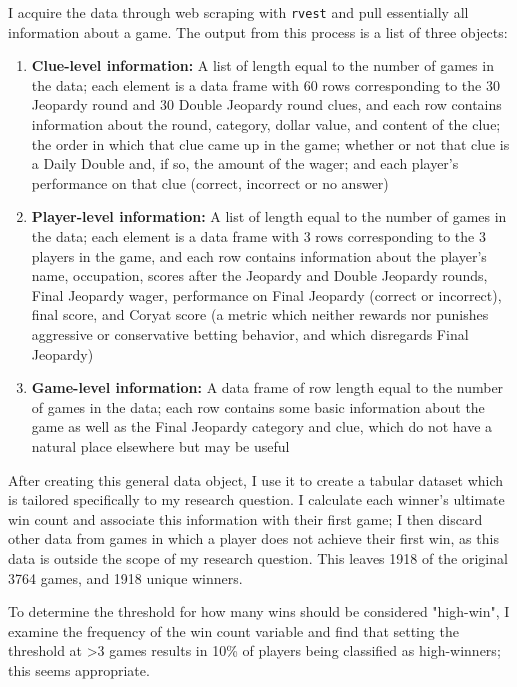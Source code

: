 \documentclass{article}
\begin{document}
	I acquire the data through web scraping with \texttt{rvest} and pull essentially all information about a game. The output from this process is a list of three objects:
	
	\begin{enumerate}
		
		\item \textbf{Clue-level information:} A list of length equal to the number of games in the data; each element is a data frame with 60 rows corresponding to the 30 Jeopardy round and 30 Double Jeopardy round clues, and each row contains information about the round, category, dollar value, and content of the clue; the order in which that clue came up in the game; whether or not that clue is a Daily Double and, if so, the amount of the wager; and each player's performance on that clue (correct, incorrect or no answer)
		
		\item \textbf{Player-level information:} A list of length equal to the number of games in the data; each element is a data frame with 3 rows corresponding to the 3 players in the game, and each row contains information about the player's name, occupation, scores after the Jeopardy and Double Jeopardy rounds, Final Jeopardy wager, performance on Final Jeopardy (correct or incorrect), final score, and Coryat score (a metric which neither rewards nor punishes aggressive or conservative betting behavior, and which disregards Final Jeopardy)
		
		\item \textbf{Game-level information:} A data frame of row length equal to the number of games in the data; each row contains some basic information about the game as well as the Final Jeopardy category and clue, which do not have a natural place elsewhere but may be useful
		
	\end{enumerate}

	After creating this general data object, I use it to create a tabular dataset which is tailored specifically to my research question. I calculate each winner's ultimate win count and associate this information with their first game; I then discard other data from games in which a player does not achieve their first win, as this data is outside the scope of my research question. This leaves 1918 of the original 3764 games, and 1918 unique winners.
	
	To determine the threshold for how many wins should be considered "high-win", I examine the frequency of the win count variable and find that setting the threshold at >3 games results in 10\% of players being classified as high-winners; this seems appropriate.
	
\end{document}
